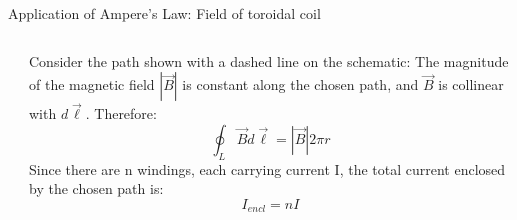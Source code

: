 \begin{frame}{Application of Ampere's Law: Field of toroidal coil}
\begin{columns}
\begin{column}{0.33\textwidth}
\begin{center}
    \end{center}
  \end{column}
  \begin{column}{0.67\textwidth}
      Consider the path shown with a dashed line on the schematic:
      The magnitude of the magnetic field $|\vec{B}|$ is constant along the chosen path, and
      $\vec{B}$ is collinear with $ d\vec{\ell}$. Therefore:
     \begin{equation*}
        \oint_{L} \vec{B} d\vec{\ell} = |\vec{B}| 2\pi r
     \end{equation*}
     Since there are n windings, each carrying current I, the total current enclosed
     by the chosen path is:
     \begin{equation*}
        I_{encl} = n I
     \end{equation*}
  \end{column}
\end{columns}

\end{frame}

%
%
%

